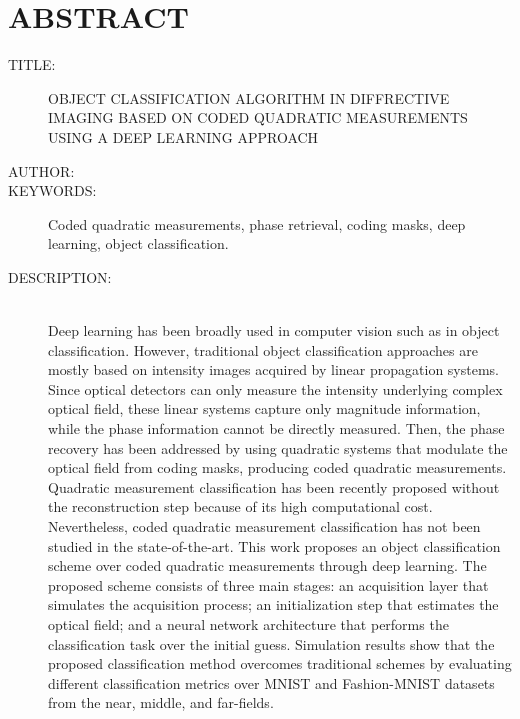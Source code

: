 
\chapter*{ABSTRACT}

\footnotesize{
\begin{description}
  \item[TITLE:] OBJECT CLASSIFICATION ALGORITHM IN DIFFRECTIVE IMAGING BASED ON CODED QUADRATIC MEASUREMENTS USING A DEEP LEARNING APPROACH
  \item[AUTHOR:] \MakeUppercase{\autor} 
  \item[KEYWORDS:] Coded quadratic measurements, phase retrieval, coding masks, deep learning, object classification.
  \item[DESCRIPTION:]\hfill \\ Deep learning has been broadly used in computer vision such as in object classification. However, traditional object classification approaches are mostly based on intensity images acquired by linear propagation systems. Since optical detectors can only measure the intensity underlying complex optical field, these linear systems capture only magnitude information, while the phase information cannot be directly measured. Then, the phase recovery has been addressed by using quadratic systems that modulate the optical field from coding masks, producing coded quadratic measurements. Quadratic measurement classification has been recently proposed without the reconstruction step because of its high computational cost. Nevertheless, coded quadratic measurement classification has not been studied in the state-of-the-art.  This work proposes an object classification scheme over coded quadratic measurements through deep learning. The proposed scheme consists of three main stages: an acquisition layer that simulates the acquisition process; an initialization step that estimates the optical field; and a neural network architecture that performs the classification task over the initial guess. Simulation results show that the proposed classification method overcomes traditional schemes by evaluating different classification metrics over MNIST and Fashion-MNIST datasets from the near, middle, and far-fields.
\end{description}}\normalsize
